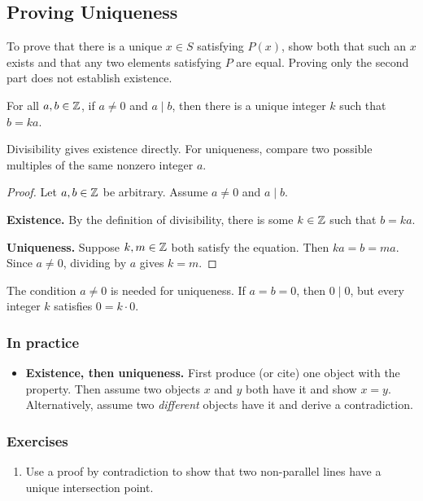 \subsection{Proving Uniqueness}
To prove that there is a unique $x\in S$ satisfying $P(x)$, show both that
such an $x$ exists and that any two elements satisfying $P$ are equal.
Proving only the second part does not establish existence.

\begin{proposition}
    For all $a,b\in\mathbb{Z}$, if $a\neq 0$ and $a\mid b$, then there is a unique
    integer $k$ such that $b=ka$.
\end{proposition}
\begin{remark}
    Divisibility gives existence directly. For uniqueness, compare two
    possible multiples of the same nonzero integer $a$.
\end{remark}
\begin{proof}
    Let $a,b\in\mathbb{Z}$ be arbitrary. Assume $a\neq 0$ and $a\mid b$.

    \textbf{Existence.} By the definition of divisibility, there is some
    $k\in\mathbb{Z}$ such that $b=ka$.

    \textbf{Uniqueness.} Suppose $k,m\in\mathbb{Z}$ both satisfy the equation. Then
    $ka=b=ma$. Since $a\neq 0$, dividing by $a$ gives $k=m$.
\end{proof}
\begin{remark}
    The condition $a\neq 0$ is needed for uniqueness. If $a=b=0$, then
    $0\mid 0$, but every integer $k$ satisfies $0=k\cdot0$.
\end{remark}

\subsubsection*{In practice}
\begin{itemize}
    \item \textbf{Existence, then uniqueness.} First produce (or cite) one
    object with the property. Then assume two objects $x$ and $y$ both have it
    and show $x=y$. Alternatively, assume two \emph{different} objects have it
    and derive a contradiction.
\end{itemize}

\subsubsection*{Exercises}
\begin{enumerate}
    \item Use a proof by contradiction to show that two non-parallel lines
    have a unique intersection point.
\end{enumerate}
